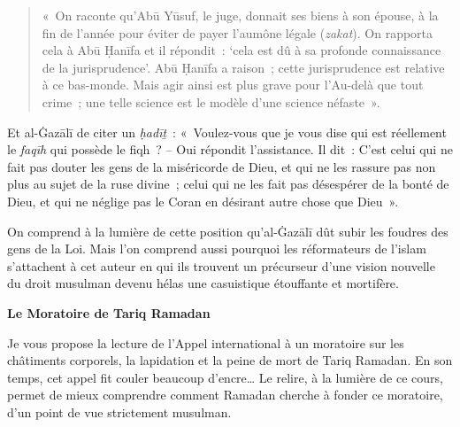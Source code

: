 \begin{quote}
«~On raconte qu'Abū Yūsuf, le juge, donnait ses biens à son épouse, à la
fin de l'année pour éviter de payer l'aumône légale (\emph{zakat}). On
rapporta cela à Abū Ḥanīfa et il répondit~: `cela est dû à sa profonde
connaissance de la jurisprudence'. Abū Ḥanīfa a raison~; cette
jurisprudence est relative à ce bas-monde. Mais agir ainsi est plus
grave pour l'Au-delà que tout crime~; une telle science est le modèle
d'une science néfaste~».
\end{quote}

Et al-Ġazālī de citer un \emph{ḥadīṯ}~: «~Voulez-vous que je vous dise
qui est réellement le \emph{faqīh} qui possède le fiqh~? -- Oui répondit
l'assistance. Il dit~: C'est celui qui ne fait pas douter les gens de la
miséricorde de Dieu, et qui ne les rassure pas non plus au sujet de la
ruse divine~; celui qui ne les fait pas désespérer de la bonté de Dieu,
et qui ne néglige pas le Coran en désirant autre chose que
Dieu~».

On comprend à la lumière de cette position qu'al-Ġazālī dût subir les
foudres des gens de la Loi. Mais l'on comprend aussi pourquoi les
réformateurs de l'islam s'attachent à cet auteur en qui ils trouvent un
précurseur d'une vision nouvelle du droit musulman devenu hélas une
casuistique étouffante et mortifère.


\textbf{Le Moratoire de Tariq Ramadan}

Je vous propose la lecture de l'Appel international à un moratoire sur
les châtiments corporels, la lapidation et la peine de mort de Tariq
Ramadan. En son temps, cet appel fit couler beaucoup d'encre\ldots{} Le
relire, à la lumière de ce cours, permet de mieux comprendre comment
Ramadan cherche à fonder ce moratoire, d'un point de vue strictement
musulman.



